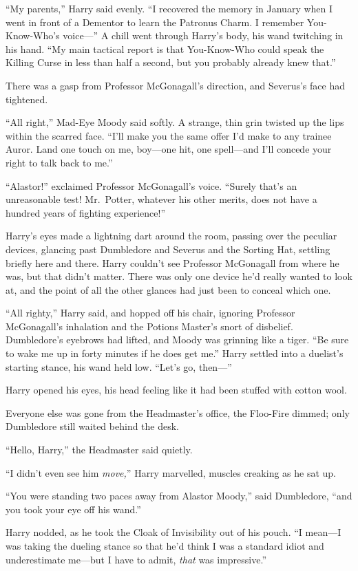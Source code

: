 “My parents,” Harry said evenly. “I recovered the memory in January when I went in front of a Dementor to learn the Patronus Charm. I remember You-Know-Who’s voice—” A chill went through Harry’s body, his wand twitching in his hand. “My main tactical report is that You-Know-Who could speak the Killing Curse in less than half a second, but you probably already knew that.”

There was a gasp from Professor McGonagall’s direction, and Severus’s face had tightened.

“All right,” Mad-Eye Moody said softly. A strange, thin grin twisted up the lips within the scarred face. “I’ll make you the same offer I’d make to any trainee Auror. Land one touch on me, boy—one hit, one spell—and I’ll concede your right to talk back to me.”

“Alastor!” exclaimed Professor McGonagall’s voice. “Surely that’s an unreasonable test! Mr.~Potter, whatever his other merits, does not have a hundred years of fighting experience!”

Harry’s eyes made a lightning dart around the room, passing over the peculiar devices, glancing past Dumbledore and Severus and the Sorting Hat, settling briefly here and there. Harry couldn’t see Professor McGonagall from where he was, but that didn’t matter. There was only one device he’d really wanted to look at, and the point of all the other glances had just been to conceal which one.

“All righty,” Harry said, and hopped off his chair, ignoring Professor McGonagall’s inhalation and the Potions Master’s snort of disbelief. Dumbledore’s eyebrows had lifted, and Moody was grinning like a tiger. “Be sure to wake me up in forty minutes if he does get me.” Harry settled into a duelist’s starting stance, his wand held low. “Let’s go, then—”
\sbreak

Harry opened his eyes, his head feeling like it had been stuffed with cotton wool.

Everyone else was gone from the Headmaster’s office, the Floo-Fire dimmed; only Dumbledore still waited behind the desk.

“Hello, Harry,” the Headmaster said quietly.

“I didn’t even see him \emph{move,}” Harry marvelled, muscles creaking as he sat up.

“You were standing two paces away from Alastor Moody,” said Dumbledore, “and you took your eye off his wand.”

Harry nodded, as he took the Cloak of Invisibility out of his pouch. “I mean—I was taking the dueling stance so that he’d think I was a standard idiot and underestimate me—but I have to admit, \emph{that} was impressive.”

